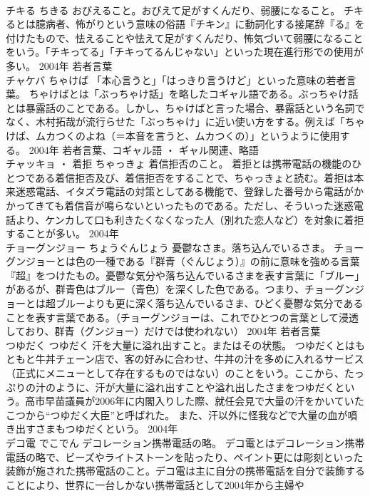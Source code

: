 \documentclass[8pt]{extreport}
\begin{document}
\begin{CJK}{UTF8}{min}
\\	チキる	ちきる	おびえること。おびえて足がすくんだり、弱腰になること。	チキるとは臆病者、怖がりという意味の俗語『チキン』に動詞化する接尾辞『る』を付けたもので、怯えることや怯えて足がすくんだり、怖気づいて弱腰になることをいう。「チキってる」「チキってるんじゃない」といった現在進行形での使用が多い。	2004年	若者言葉	
\\	チャケバ	ちゃけば	「本心言うと」「はっきり言うけど」といった意味の若者言葉。	ちゃけばとは「ぶっちゃけ話」を略したコギャル語である。ぶっちゃけ話とは暴露話のことである。しかし、ちゃけばと言った場合、暴露話という名詞でなく、木村拓哉が流行らせた「ぶっちゃけ」に近い使い方をする。例えば「ちゃけば、ムカつくのよね（＝本音を言うと、ムカつくの）」というように使用する。	2004年	若者言葉、コギャル語 ・ ギャル関連、略語	
\\	チャッキョ ・ 着拒	ちゃっきょ	着信拒否のこと。	着拒とは携帯電話の機能のひとつである着信拒否及び、着信拒否をすることで、ちゃっきょと読む。着拒は本来迷惑電話、イタズラ電話の対策としてある機能で、登録した番号から電話がかかってきても着信音が鳴らないといったものである。ただし、そういった迷惑電話より、ケンカして口も利きたくなくなった人（別れた恋人など）を対象に着拒することが多い。	2004年	
\\	チョーグンジョー	ちょうぐんじょう	憂鬱なさま。落ち込んでいるさま。	チョーグンジョーとは色の一種である『群青（ぐんじょう）』の前に意味を強める言葉『超』をつけたもの。憂鬱な気分や落ち込んでいるさまを表す言葉に「ブルー」があるが、群青色はブルー（青色）を深くした色である。つまり、チョーグンジョーとは超ブルーよりも更に深く落ち込んでいるさま、ひどく憂鬱な気分であることを表す言葉である。（チョーグンジョーは、これでひとつの言葉として浸透しており、群青（グンジョー）だけでは使われない）	2004年	若者言葉	
\\	つゆだく	つゆだく	汗を大量に溢れ出すこと。またはその状態。	つゆだくとはもともと牛丼チェーン店で、客の好みに合わせ、牛丼の汁を多めに入れるサービス（正式にメニューとして存在するものではない）のことをいう。ここから、たっぷりの汁のように、汗が大量に溢れ出すことや溢れ出したさまをつゆだくという。高市早苗議員が2006年に内閣入りした際、就任会見で大量の汗をかいていたこつから“つゆだく大臣”と呼ばれた。 また、汗以外に怪我などで大量の血が噴き出すさまもつゆだくという。	2004年	
\\	デコ電	でこでん	デコレーション携帯電話の略。	デコ電とはデコレーション携帯電話の略で、ビーズやライトストーンを貼ったり、ペイント更には彫刻といった装飾が施された携帯電話のこと。デコ電は主に自分の携帯電話を自分で装飾することにより、世界に一台しかない携帯電話として2004年から主婦や

\end{CJK}
\end{document}
